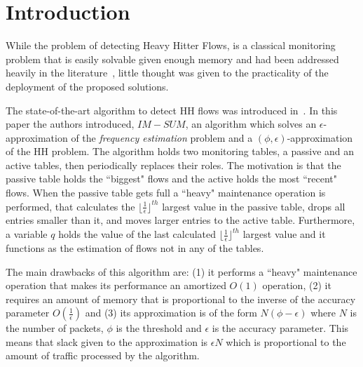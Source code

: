 \section{Introduction}
\label{sec:introduction}

While the problem of detecting Heavy Hitter Flows, is a classical monitoring problem that is easily solvable given enough memory and had been addressed heavily in the literature~\cite{fang1999computing,gilbert2001surfing,karp2003simple,Demaine2002,slidingHH,basat2017optimal,zadnik2011evolution}, little thought was given to the practicality of the deployment of the proposed solutions.

The state-of-the-art algorithm to detect HH flows was introduced in~\cite{basat2017optimal}. In this paper the authors introduced, $IM-SUM$, an algorithm which solves an $\epsilon$-approximation of the \textit{frequency estimation} problem and a $(\phi, \epsilon)$-approximation of the HH problem. The algorithm holds two monitoring tables, a passive and an active tables, then periodically replaces their roles. The motivation is that the passive table holds the ``biggest" flows and the active holds the most ``recent" flows. When the passive table gets full a ``heavy" maintenance operation is performed, that calculates the $\lfloor\frac{1}{\epsilon}\rfloor^{th}$ largest value in the passive table, drops all entries smaller than it, and moves larger entries to the active table. Furthermore, a variable $q$ holds the value of the last calculated $\lfloor\frac{1}{\epsilon}\rfloor^{th}$ largest value and it functions as the estimation of flows not in any of the tables.

The main drawbacks of this algorithm are: (1) it performs a ``heavy" maintenance operation that makes its performance an amortized $O(1)$ operation, (2) it requires an amount of memory that is proportional to the inverse of the accuracy parameter $O(\frac{1}{\epsilon})$ and (3) its approximation is of the form $N(\phi -\epsilon)$ where $N$ is the number of packets, $\phi$ is the threshold and $\epsilon$ is the accuracy parameter. This means that slack given to the approximation is $\epsilon N$ which is proportional to the amount of traffic processed by the algorithm.

